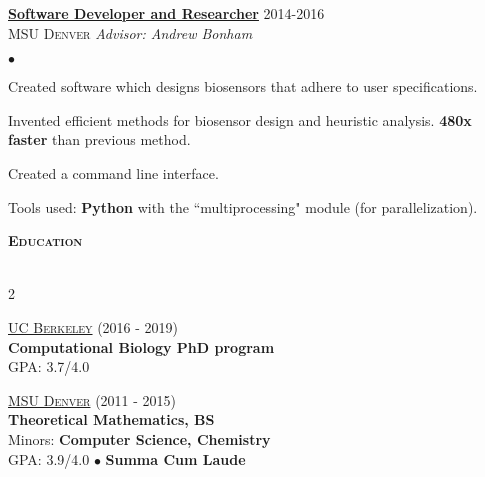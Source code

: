 \documentclass{article}
\newcommand{\lineunder}{\vspace*{-8pt} \\ \hspace*{-18pt} \hrulefill \\}
\newcommand{\header}[1]{{\vspace*{8pt}\hspace*{-16pt} \textsc{\textbf{\large{#1}}}} \vspace*{4pt} \lineunder \vspace*{4pt}}
\newcommand{\experience}[4]{{\vspace{-2pt}\bf{\underline{#1}}} \hfill  #2\\{\textsc{#3} \hfill \emph{#4}\\  }}
\newcommand{\school}[4]{
 \textsc{\underline{#1}} (#3)
 \\ \vspace{3pt} \textbf{#2} 
 \\   #4
\vspace{5pt}
}
\newcommand{\schooltwo}[6]{
    \textsc{\underline{#1}} (#3) 
    \\ \vspace{3pt} \textbf{#2, BS} 
    \\ Minors: \textbf{#5}
    \\  #4 $\bullet$ \textbf{#6}
    \vspace{3pt}
}
\newenvironment{achievements}{\begin{list}{$\bullet$}{\topsep 0pt \itemsep -2pt}}{\vspace*{4pt}\end{list}}
\begin{document}
    
\experience{Software Developer and Researcher}{2014-2016}{MSU Denver}{Advisor: Andrew Bonham}
\begin{achievements}
    \item Created software which designs biosensors that adhere to user specifications.
    \item Invented efficient methods for biosensor design and heuristic analysis. \textbf{480x faster} than previous method.
    \item Created a command line interface.
    \item Tools used: \textbf{Python} with the ``multiprocessing" module (for parallelization).
\end{achievements}





\vspace{-5pt}
\header{Education}
\vspace{-14pt}
\begin{multicols}{2}
    
\school{UC Berkeley}{Computational Biology PhD program}{2016 - 2019}{GPA: 3.7/4.0}

\columnbreak
\schooltwo{MSU Denver}{Theoretical Mathematics}{2011 - 2015}{GPA: 3.9/4.0}{Computer Science, Chemistry}{Summa Cum Laude}

\end{multicols}
\end{document}
